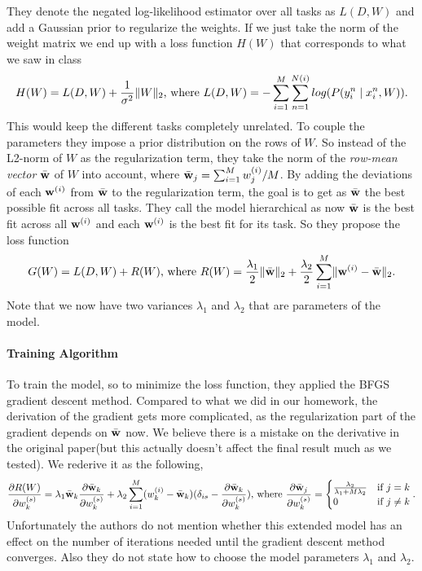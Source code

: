 They denote the negated log-likelihood estimator over all tasks as $L(D,W)$ and add a Gaussian prior to regularize the weights. If we just take the norm of the weight matrix we end up with a loss function $H(W)$ that corresponds to what we saw in class
\begin{align*}
H(W) = L(D,W) + \frac{1}{\sigma^2} \lVert W\rVert_2 \text{, where } L(D,W) = -\sum_{i=1}^{M} \sum_{n=1}^{N(i)} log(P(y_i^n \mid x_i^n, W)).
\end{align*}
This would keep the different tasks completely unrelated. To couple the parameters they impose a prior distribution on the rows of $W$. So instead of the L2-norm of $W$ as the regularization term, they take the norm of the \emph{row-mean vector} $\bar{\textbf{w}}$ of $W$ into account, where $\bar{\textbf{w}}_j = \sum_{i=1}^M w_{j}^{(i)}/M$.
By adding the deviations of each $\textbf{w}^{(i)}$ from $\bar{\textbf{w}}$ to the regularization term, the goal is to get as $\bar{\textbf{w}}$ the best possible fit across all tasks. They call the model hierarchical as now $\bar{\textbf{w}}$ is the best fit across all $\textbf{w}^{(i)}$ and each $\textbf{w}^{(i)}$ is the best fit for its task. So they propose the loss function
\begin{align*}
G(W) = L(D,W) + R(W) \text{, where } R(W) = \frac{\lambda_1}{2} \lVert\bar{\textbf{w}}\rVert_2 + \frac{\lambda_2}{2} \sum_{i=1}^M \lVert\textbf{w}^{(i)} - \bar{\textbf{w}}\rVert_2.
\end{align*}
Note that we now have two variances $\lambda_1$ and $\lambda_2$ that are parameters of the model.

\paragraph{Training Algorithm}
To train the model, so to minimize the loss function, they applied the BFGS gradient descent method. Compared to what we did in our homework, the derivation of the gradient gets more complicated, as the regularization part of the gradient depends on $\bar{\textbf{w}}$ now. We believe there is a mistake on the derivative in the original paper(but this actually doesn't affect the final result much as we tested). We rederive it as the following,
\begin{align*}
\frac{\partial R(W)}{\partial w_k^{(s)}} = \lambda_1 \bar{\textbf{w}}_k\frac{\partial \bar{\textbf{w}}_k}{\partial w_k^{(s)}} + \lambda_2 \sum_{i=1}^{M}(w_k^{(i)} - \bar{\textbf{w}}_k)(\delta_{is} - \frac{\partial\bar{\textbf{w}}_k}{\partial w_k^{(s)}}) \text{, where } \frac{\partial \bar{\textbf{w}}_j}{\partial w_k^{(s)}} = \begin{cases} \frac{\lambda_2}{\lambda_1 + M\lambda_2} & \text{if } j=k\\
0 & \text{if } j\neq k
\end{cases}.
\end{align*}
Unfortunately the authors do not mention whether this extended model has an effect on the number of iterations needed until the gradient descent method converges. Also they do not state how to choose the model parameters $\lambda_1$ and $\lambda_2$.
